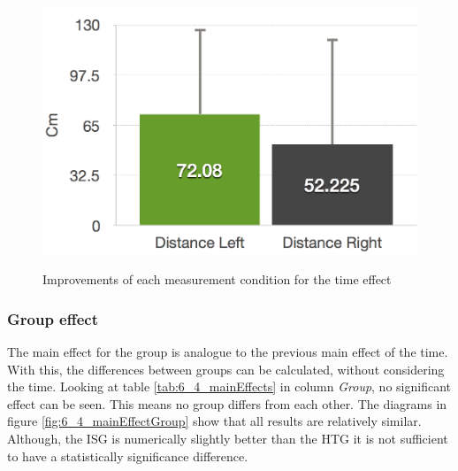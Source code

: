 \begin{figure}[htb]
		\hfill
	\begin{minipage}[t]{0.32\linewidth}
		\centering
		\includegraphics[width=1\linewidth]{Pictures/6_4_DIA_DistanceAllDiff}
		\label{fig:6_4_distanceAllDiff}
	\end{minipage}
	\caption{Improvements of each measurement condition for the time effect}
	\label{fig:6_4_timeImprovement}
\end{figure}

\subsubsection{Group effect}
The main effect for the group is analogue to the previous main effect of the time.
With this, the differences between groups can be calculated, without considering the time.
Looking at table \ref{tab:6_4_mainEffects} in column \textit{Group}, no significant effect can be seen.
This means no group differs from each other.
The diagrams in figure \ref{fig:6_4_mainEffectGroup} show that all results are relatively similar.
Although, the ISG is numerically slightly better than the HTG it is not sufficient to have a statistically significance difference.

